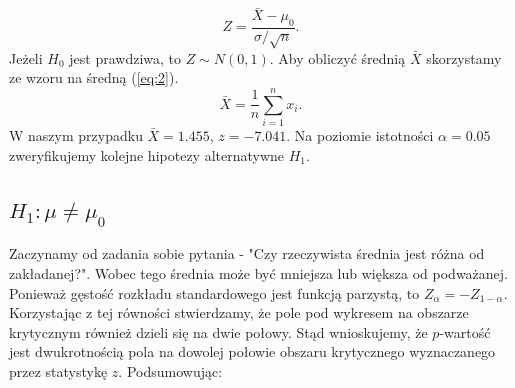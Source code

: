 \documentclass{article}
\theoremstyle{break}
\begin{document}
\begin{subequations} \label{eq:1}
\begin{equation}
Z = \frac{\bar{X}-\mu_0}{\sigma/\sqrt{n}}.
\end{equation}
\end{subequations}
Jeżeli $H_0$ jest prawdziwa, to $Z\sim N(0,1)$. Aby obliczyć średnią $\bar{X}$ skorzystamy ze wzoru na średną (\ref{eq:2}).
\begin{subequations} \label{eq:2}
\begin{equation}
\bar{X}=\frac{1}{n}\sum\limits_{i=1}^{n}x_i.
\end{equation}
\end{subequations}
W naszym przypadku $\bar{X}=1.455$, $z=-7.041$.
Na poziomie istotności $\alpha = 0.05$ zweryfikujemy kolejne hipotezy alternatywne $H_1$.
\newpage
\subsection{$H_1: \mu \ne \mu_0$}

Zaczynamy od zadania sobie pytania - "Czy rzeczywista średnia jest różna od zakładanej?". Wobec tego średnia może być mniejsza lub większa od podważanej.
Ponieważ gęstość rozkładu standardowego jest funkcją parzystą, to $Z_\alpha = -Z_{1-\alpha}$. Korzystając z tej równości stwierdzamy, że pole pod wykresem na obszarze krytycznym
również dzieli się na dwie połowy. Stąd wnioskujemy, że $p$-wartość jest dwukrotnością pola na dowolej połowie obszaru krytycznego wyznaczanego przez statystykę $z$.
Podsumowując:
\end{document}
